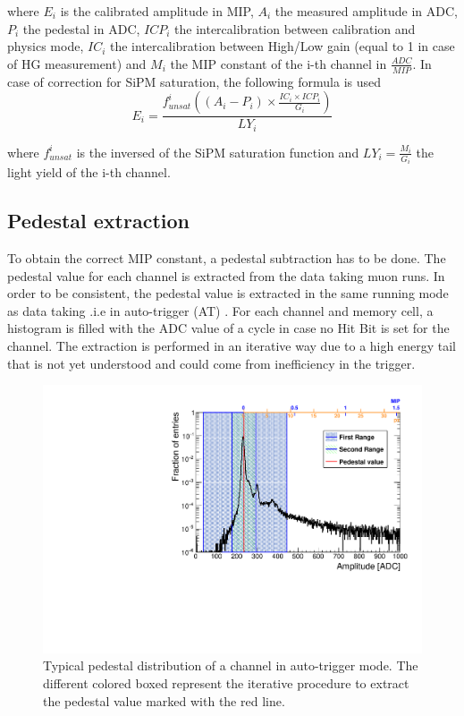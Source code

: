 where $E_i$ is the calibrated amplitude in MIP, $A_i$ the measured amplitude in ADC, $P_i$ the pedestal in ADC, $ICP_i$ the intercalibration between calibration and physics mode, $IC_i$ the intercalibration between High/Low gain (equal to 1 in case of HG measurement) and $M_{i}$ the MIP constant of the i-th channel in $\frac{ADC}{MIP}$. In case of correction for SiPM saturation, the following formula is used
\begin{equation}
	E_i = \frac{f^{i}_{unsat}( (A_i - P_i) \times \frac{IC_i \times ICP_i}{G_i} )}{LY_{i}}
\end{equation}

where $f^{i}_{unsat}$ is the inversed of the SiPM saturation function and $LY_{i} = \frac{M_{i}}{G_i}$ the light yield of the i-th channel.

\subsection{Pedestal extraction}

To obtain the correct MIP constant, a pedestal subtraction has to be done. The pedestal value for each channel is extracted from the data taking muon runs. In order to be consistent, the pedestal value is extracted in the same running mode as data taking .i.e in auto-trigger (AT) \cite{Hermberg:2015gaa}. For each channel and memory cell, a histogram is filled with the ADC value of a cycle in case no Hit Bit is set for the channel. The extraction is performed in an iterative way due to a high energy tail that is not yet understood and could come from inefficiency in the trigger.

\begin{figure}[htbp!]
	\centering
	\includegraphics[width=0.7\linewidth]{../Thesis_Plots/EnergyCalib/Plots/PedestalExtractionExample.pdf}
	\caption{Typical pedestal distribution of a channel in auto-trigger mode. The different colored boxed represent the iterative procedure to extract the pedestal value marked with the red line.} \label{fig:PedExtraction}
\end{figure}

